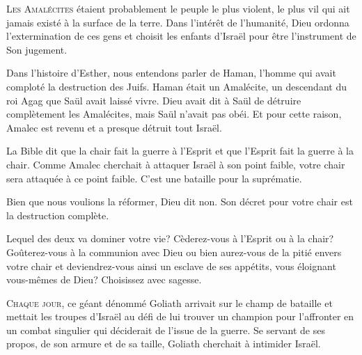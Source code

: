 \lettrine{L}{es Amalécites} étaient probablement le peuple le plus violent,
 le plus vil qui ait jamais existé à la surface de la terre.
 Dans l'intérêt de l'humanité, Dieu ordonna l'extermination de ces gens
 et choisit les enfants d'Israël pour être l'instrument de Son jugement.

Dans l'histoire d'Esther, nous entendons parler de Haman,
 l'homme qui avait comploté la destruction des Juifs.
 Haman était un Amalécite, un descendant du roi Agag que Saül
 avait laissé vivre.
 Dieu avait dit à Saül de \Og détruire complètement \Fg{} les Amalécites,
 mais Saül n'avait pas obéi.
 Et pour cette raison, Amalec est revenu et a presque détruit tout Israël.

La Bible dit que la chair fait la guerre à l'Esprit et que l'Esprit
 fait la guerre à la chair.
 Comme Amalec cherchait à attaquer Israël à son point faible,
 votre chair sera attaquée à ce point faible.
 C'est une bataille pour la suprématie.


Bien que nous voulions la réformer, Dieu dit non.
 Son décret pour votre chair est la destruction complète.

Lequel des deux va dominer votre vie?
 Cèderez-vous à l'Esprit ou à la chair?
 Goûterez-vous à la communion avec Dieu ou bien aurez-vous
 de la pitié envers votre chair et deviendrez-vous ainsi
 un esclave de ses appétits, vous éloignant vous-mêmes de Dieu?
 Choisissez avec sagesse. 

\dvrule







\lettrine{C}{haque jour}, ce géant dénommé Goliath arrivait
 sur le champ de bataille et mettait les troupes d'Israël
 au défi de lui trouver un champion pour l'affronter
 en un combat singulier qui déciderait de l'issue de la guerre.
 Se servant de ses propos, de son armure et de sa taille,
 Goliath cherchait à intimider Israël. 

